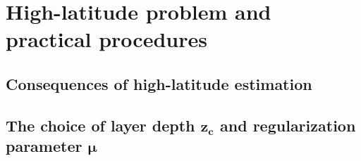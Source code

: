 %
%
%

\section{High-latitude problem and practical procedures}

\subsection{Consequences of high-latitude estimation}


\subsection{The choice of layer depth $\mathbf{z_c}$ and regularization parameter $\mathbf{\mu}$}

